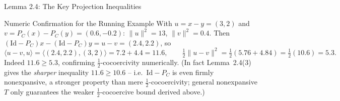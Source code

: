 \documentclass[aspectratio=169,10pt]{beamer}
\newcommand{\Id}{\mathrm{Id}}
\begin{document}
\begin{frame}[allowframebreaks]{Lemma 2.4: The Key Projection Inequalities}
  \framebreak

  \begin{exampleblock}{Numeric Confirmation for the Running Example}
    With $u = x - y = (3,2)$ and $v = P_C(x)-P_C(y) = (0.6,-0.2)$:
    $\|u\|^2 = 13$, $\|v\|^2 = 0.4$. Then
    $(\Id-P_C)x - (\Id-P_C)y = u - v = (2.4, 2.2)$, so
    \[
      \langle u-v, u\rangle = \langle (2.4,2.2),(3,2)\rangle = 7.2+4.4 = 11.6,
      \qquad
      \tfrac12\|u-v\|^2 = \tfrac12(5.76+4.84) = \tfrac12(10.6) = 5.3.
    \]
    Indeed $11.6 \ge 5.3$, confirming $\tfrac12$-cocoercivity numerically.
    (In fact Lemma~2.4(3) gives the \emph{sharper} inequality
    $11.6 \ge 10.6$ -- i.e.\ $\Id - P_C$ is even firmly nonexpansive, a
    stronger property than mere $\tfrac12$-cocoercivity; general nonexpansive
    $T$ only guarantees the weaker $\tfrac12$-cocoercive bound derived above.)
  \end{exampleblock}

\end{frame}
\end{document}
